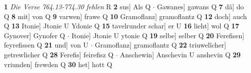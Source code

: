 \documentclass[8pt,a4paper,notitlepage]{article}
\begin{document}
\begin{table}[ht]
\begin{minipage}[t]{0.5\linewidth}
\textbf{1} \textit{Die Verse 764.13-774.30 fehlen} R  \textbf{2} sus] Als Q  $\cdot$ Gawanes] gawans Q \textbf{7} dâ] do Q \textbf{8} mit] von Q \textbf{9} varwen] frawe Q \textbf{10} Gramoflanz] gramoflantz Q \textbf{12} doch] auch Q \textbf{13} Itonie] Jtonie U Ydonie Q \textbf{15} tavelrunder schar] er U \textbf{16} lieht] wol Q \textbf{17} Gynover] Gynofer Q  $\cdot$ Itonie] Jtonie U ytonie Q \textbf{19} selbe] selber Q \textbf{20} Ferefisen] feyrefissen Q \textbf{21} und] von U  $\cdot$ Gramoflanz] gramoflantz Q \textbf{22} triuwelîcher] getrewlicher Q \textbf{28} Ferefis] feirefisz Q  $\cdot$ Anschewin] Anschevin U anshevin Q \textbf{29} vriunden] frewden Q \textbf{30} het] hott Q \newline
\end{minipage}
\end{table}
\end{document}
